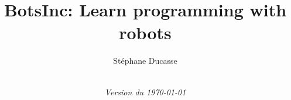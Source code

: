 \documentclass[a4paper,10pt,twoside]{book}
\begin{document}
\frontmatter
\setcounter{page}{1}
\pagestyle{headings}
\author{
	St\'ephane Ducasse\\[1ex]
	\\[4ex]
	}
\title{\Huge\bf BotsInc: Learn programming with robots}
\numdate
\date{\emph{Version du \today}}
\maketitle
~ %
\vfill
\end{document}

